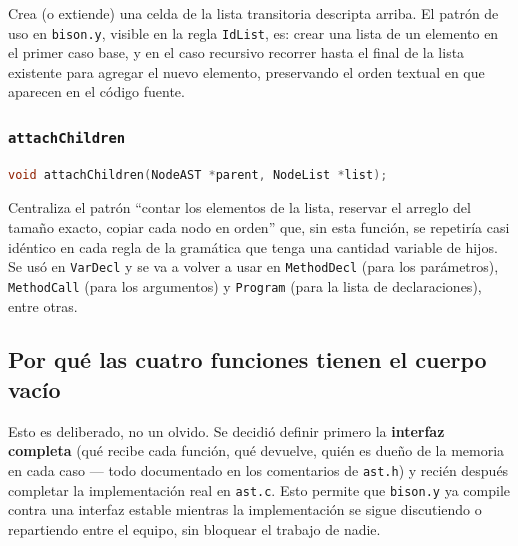 \documentclass[11pt,a4paper]{article}
\begin{document}
Crea (o extiende) una celda de la lista transitoria descripta arriba.
El patr\'on de uso en \texttt{bison.y}, visible en la regla
\texttt{IdList}, es: crear una lista de un elemento en el primer caso
base, y en el caso recursivo recorrer hasta el final de la lista
existente para agregar el nuevo elemento, preservando el orden textual
en que aparecen en el c\'odigo fuente.

\subsubsection{\texttt{attachChildren}}

\begin{lstlisting}[language=C]
void attachChildren(NodeAST *parent, NodeList *list);
\end{lstlisting}

Centraliza el patr\'on ``contar los elementos de la lista, reservar el
arreglo del tama\~no exacto, copiar cada nodo en orden'' que, sin esta
funci\'on, se repetir\'ia casi id\'entico en cada regla de la gram\'atica
que tenga una cantidad variable de hijos. Se us\'o en \texttt{VarDecl} y
se va a volver a usar en \texttt{MethodDecl} (para los par\'ametros),
\texttt{MethodCall} (para los argumentos) y \texttt{Program} (para la
lista de declaraciones), entre otras.

\subsection{Por qu\'e las cuatro funciones tienen el cuerpo vac\'io}

Esto es deliberado, no un olvido. Se decidi\'o definir primero la
\textbf{interfaz completa} (qu\'e recibe cada funci\'on, qu\'e devuelve, qui\'en
es due\~no de la memoria en cada caso --- todo documentado en los
comentarios de \texttt{ast.h}) y reci\'en despu\'es completar la
implementaci\'on real en \texttt{ast.c}. Esto permite que \texttt{bison.y}
ya compile contra una interfaz estable mientras la implementaci\'on se
sigue discutiendo o repartiendo entre el equipo, sin bloquear el
trabajo de nadie.
\end{document}
